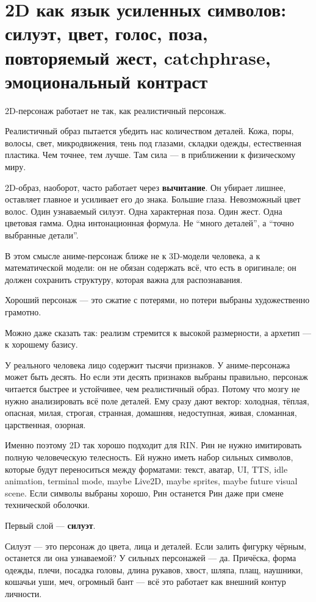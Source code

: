 \section{2D как язык усиленных символов: силуэт, цвет, голос, поза, повторяемый жест, catchphrase, эмоциональный контраст}

2D-персонаж работает не так, как реалистичный персонаж.

Реалистичный образ пытается убедить нас количеством деталей. Кожа, поры,
волосы, свет, микродвижения, тень под глазами, складки одежды,
естественная пластика. Чем точнее, тем лучше. Там сила --- в приближении
к физическому миру.

2D-образ, наоборот, часто работает через \textbf{вычитание}. Он убирает
лишнее, оставляет главное и усиливает его до знака. Большие глаза.
Невозможный цвет волос. Один узнаваемый силуэт. Одна характерная поза.
Один жест. Одна цветовая гамма. Одна интонационная формула. Не ``много
деталей'', а ``точно выбранные детали''.

В этом смысле аниме-персонаж ближе не к 3D-модели человека, а к
математической модели: он не обязан содержать всё, что есть в оригинале;
он должен сохранить структуру, которая важна для распознавания.

Хороший персонаж --- это сжатие с потерями, но потери выбраны
художественно грамотно.

Можно даже сказать так: реализм стремится к высокой размерности, а
архетип --- к хорошему базису.

У реального человека лицо содержит тысячи признаков. У аниме-персонажа
может быть десять. Но если эти десять признаков выбраны правильно,
персонаж читается быстрее и устойчивее, чем реалистичный образ. Потому
что мозгу не нужно анализировать всё поле деталей. Ему сразу дают
вектор: холодная, тёплая, опасная, милая, строгая, странная, домашняя,
недоступная, живая, сломанная, царственная, озорная.

Именно поэтому 2D так хорошо подходит для RIN. Рин не нужно имитировать
полную человеческую телесность. Ей нужно иметь набор сильных символов,
которые будут переноситься между форматами: текст, аватар, UI, TTS, idle
animation, terminal mode, maybe Live2D, maybe sprites, maybe future
visual scene. Если символы выбраны хорошо, Рин останется Рин даже при
смене технической оболочки.

Первый слой --- \textbf{силуэт}.

Силуэт --- это персонаж до цвета, лица и деталей. Если залить фигурку
чёрным, останется ли она узнаваемой? У сильных персонажей --- да.
Причёска, форма одежды, плечи, посадка головы, длина рукавов, хвост,
шляпа, плащ, наушники, кошачьи уши, меч, огромный бант --- всё это
работает как внешний контур личности.


